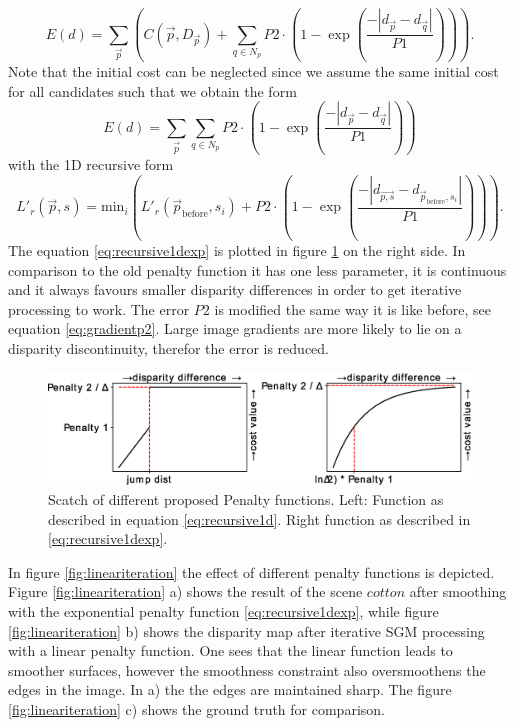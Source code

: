 \documentclass  [
  paper    = a4,
  BCOR     = 10mm,
  twoside,
  fontsize = 12pt,
  fleqn,
  toc      = bibnumbered,
  toc      = listofnumbered,
  numbers  = noendperiod,
  headings = normal,
  listof   = leveldown,
  version  = 3.03
]                                       {scrreprt}
\begin{document}
\begin{equation}\label{eq:global_sgm_function}
E(d) = \sum_{\vec p} \left(C(\vec{p}, D_{\vec p}) + \sum_{q\in N_p} 
P2\cdot \left(1- \exp\left(\frac{-|d_{\vec{p}} - d_{\vec{q}}|}{P1}\right)\right)
\right).
\end{equation}
Note that the initial cost can be neglected since we assume the same initial cost for all candidates such that we obtain the form
\begin{equation}\label{eq:global_sgm_function_wo}
E(d) = \sum_{\vec p}\sum_{q\in N_p} 
P2\cdot \left(1- \exp\left(\frac{-|d_{\vec{p}} - d_{\vec{q}}|}{P1}\right)\right)
\end{equation}
with the 1D recursive form
\begin{equation}\label{eq:recursive1dexp}
L'_r(\vec{p}, s) = \text{min}_i\left( L'_r(\vec{p}_\text{before}, s_i) + P2\cdot \left(1- \exp\left(\frac{-|d_{\vec{p,s}} - d_{\vec{p}_\text{before}, s_i}|}{P1}\right)\right)\right).
\end{equation}
The equation \ref{eq:recursive1dexp} is plotted in figure \ref{fig:penaltyfunction} on the right side. In comparison to the old penalty function it has one less parameter, it is continuous and it always favours smaller disparity differences in order to get iterative processing to work. The error $P2$ is modified the same way it is like before, see equation \ref{eq:gradientp2}. Large image gradients are more likely to lie on a disparity discontinuity, therefor the error is reduced.
\begin{figure}
	\centering
	\includegraphics[width=1\linewidth]{images/penalty_function}
	\caption[Penalty function]{Scatch of different proposed Penalty functions. Left: Function as described in equation \ref{eq:recursive1d}. Right function as described in \ref{eq:recursive1dexp}.}
	\label{fig:penaltyfunction}
\end{figure}
In figure \ref{fig:lineariteration} the effect of different penalty functions is depicted. Figure \ref{fig:lineariteration} a) shows the result of the scene $cotton$ after smoothing with the exponential penalty function \ref{eq:recursive1dexp}, while figure \ref{fig:lineariteration} b) shows the disparity map after iterative SGM processing with a linear penalty function. One sees that the linear function leads to smoother surfaces, however the smoothness constraint also oversmoothens the edges in the image. In a) the the edges are maintained sharp. The figure \ref{fig:lineariteration} c) shows the ground truth for comparison. 
\end{document}
